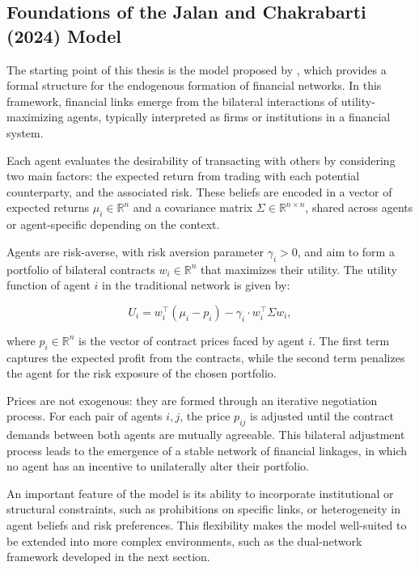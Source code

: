 \subsection{Foundations of the Jalan and Chakrabarti (2024) Model}

The starting point of this thesis is the model proposed by \cite{jalan_incentive-aware_2024}, which provides a formal structure for the endogenous formation of financial networks. In this framework, financial links emerge from the bilateral interactions of utility-maximizing agents, typically interpreted as firms or institutions in a financial system.

Each agent evaluates the desirability of transacting with others by considering two main factors: the expected return from trading with each potential counterparty, and the associated risk. These beliefs are encoded in a vector of expected returns \( \mu_i \in \mathbb{R}^n \) and a covariance matrix \( \Sigma \in \mathbb{R}^{n \times n} \), shared across agents or agent-specific depending on the context.

Agents are risk-averse, with risk aversion parameter \( \gamma_i > 0 \), and aim to form a portfolio of bilateral contracts \( w_i \in \mathbb{R}^n \) that maximizes their utility. The utility function of agent \( i \) in the traditional network is given by:

\begin{equation}
U_i = w_i^\top (\mu_i - p_i) - \gamma_i \cdot w_i^\top \Sigma w_i,
\end{equation}

where \( p_i \in \mathbb{R}^n \) is the vector of contract prices faced by agent \( i \). The first term captures the expected profit from the contracts, while the second term penalizes the agent for the risk exposure of the chosen portfolio.

Prices are not exogenous: they are formed through an iterative negotiation process. For each pair of agents \( i, j \), the price \( p_{ij} \) is adjusted until the contract demands between both agents are mutually agreeable. This bilateral adjustment process leads to the emergence of a stable network of financial linkages, in which no agent has an incentive to unilaterally alter their portfolio.

An important feature of the model is its ability to incorporate institutional or structural constraints, such as prohibitions on specific links, or heterogeneity in agent beliefs and risk preferences. This flexibility makes the model well-suited to be extended into more complex environments, such as the dual-network framework developed in the next section.



